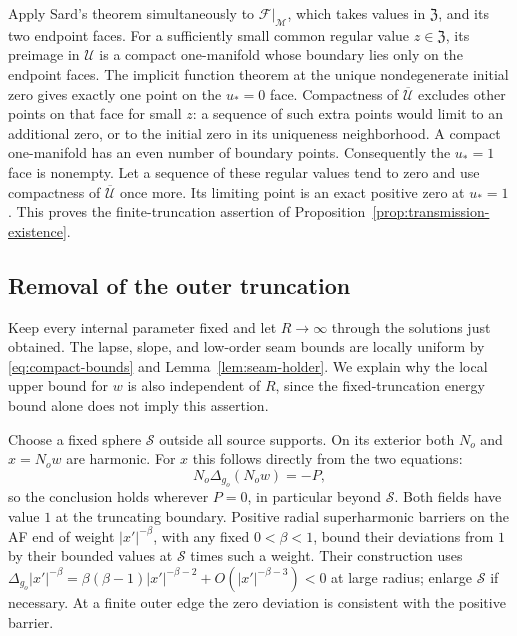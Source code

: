 Apply Sard's theorem simultaneously to $\mathscr F|_{\mathcal M}$,
which takes values in $\mathfrak Z$, and its two endpoint faces.
For a sufficiently small common regular value
$z\in\mathfrak Z$, its preimage in $\mathcal U$ is a compact
one-manifold whose boundary lies only on the endpoint faces.
The implicit function theorem at the unique nondegenerate initial
zero gives exactly one point on the $u_*=0$ face.  Compactness of
$\overline{\mathcal U}$ excludes other points on that face for
small $z$: a sequence of such extra points would limit to an
additional zero, or to the initial zero in its uniqueness
neighborhood.  A compact one-manifold has an even number of
boundary points.  Consequently the $u_*=1$ face is nonempty.
Let a sequence of these regular values tend to zero and use
compactness of $\overline{\mathcal U}$ once more.  Its limiting
point is an exact positive zero at $u_*=1$.  This proves the
finite-truncation assertion of
Proposition~\ref{prop:transmission-existence}.

\subsection{Removal of the outer truncation}

Keep every internal parameter fixed and let $R\to\infty$ through
the solutions just obtained.  The lapse, slope, and low-order seam
bounds are locally uniform by
\eqref{eq:compact-bounds} and Lemma~\ref{lem:seam-holder}.  We
explain why the local upper bound for $w$ is also independent of
$R$, since the fixed-truncation energy bound alone does not imply
this assertion.

Choose a fixed sphere $\mathcal S$ outside all source supports.
On its exterior both $N_o$ and $x=N_ow$ are harmonic.  For $x$
this follows directly from the two equations:
\begin{equation}
 N_o\Delta_{g_o}(N_ow)=-P,
 \label{eq:transmission-exterior-x}
\end{equation}
so the conclusion holds wherever $P=0$, in particular beyond
$\mathcal S$.  Both fields have value $1$ at the truncating
boundary.  Positive radial superharmonic barriers on the AF end
of weight $|x'|^{-\beta}$, with any fixed $0<\beta<1$, bound
their deviations from $1$ by their bounded values at
$\mathcal S$ times such a weight.  Their construction uses
$\Delta_{g_o}|x'|^{-\beta}
=\beta(\beta-1)|x'|^{-\beta-2}
+O(|x'|^{-\beta-3})<0$ at large radius; enlarge $\mathcal S$
if necessary.  At a finite outer edge the zero deviation is
consistent with the positive barrier.

